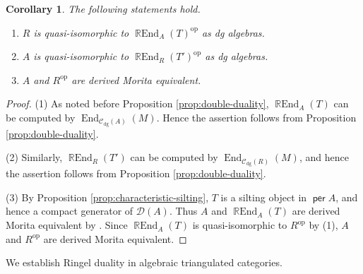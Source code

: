 \documentclass[a4paper,reqno,11pt]{amsart}
\numberwithin{equation}{section}
\newtheorem{corollary}[theorem]{Corollary}
\theoremstyle{definition}
\newcommand{\C}{\mathcal{C}}
\newcommand{\D}{\mathcal{D}}
\newcommand{\op}{\mathrm{op}}
\DeclareMathOperator{\per}{\mathsf{per}}
\DeclareMathOperator{\End}{End}
\DeclareMathOperator{\REnd}{\mathbb{R}End}
\newcommand{\dgmod}{\C_{\mathrm{dg}}}
\begin{document}
\begin{corollary}\label{cor:double-duality}
The following statements hold.
\begin{enumerate}
\item $R$ is quasi-isomorphic to $\REnd_{A}(T)^{\op}$ as dg algebras.
\item $A$ is quasi-isomorphic to $\REnd_{R}(T')^{\op}$ as dg algebras.
\item $A$ and $R^{\op}$ are derived Morita equivalent.
\end{enumerate}
\end{corollary}
\begin{proof}
(1) As noted before Proposition \ref{prop:double-duality}, $\REnd_{A}(T)$ can be computed by $\End_{\dgmod(A)}(M)$.
Hence the assertion follows from Proposition \ref{prop:double-duality}.

(2) Similarly, $\REnd_{R}(T')$ can be computed by $\End_{\dgmod(R)}(M)$, and hence the assertion follows from Proposition \ref{prop:double-duality}.

(3) By Proposition \ref{prop:characteristic-silting}, $T$ is a silting object in $\per A$, and hence a compact generator of $\D(A)$.
Thus $A$ and $\REnd_{A}(T)$ are derived Morita equivalent by \cite{K94}.
Since $\REnd_{A}(T)$ is quasi-isomorphic to $R^{\op}$ by (1), $A$ and $R^{\op}$ are derived Morita equivalent.
\end{proof}

We establish Ringel duality in algebraic triangulated categories.
\end{document}
